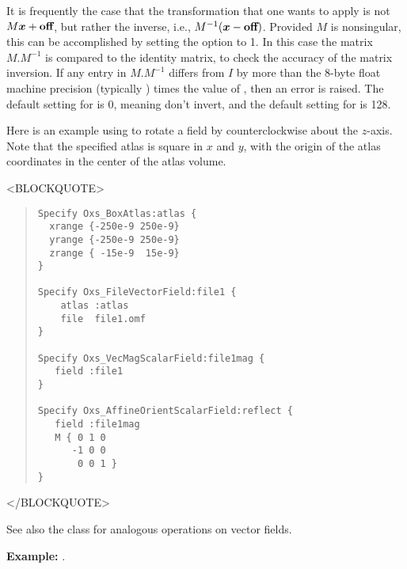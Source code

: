 \begin{description}
It is frequently the case that the transformation that one wants to
apply is not $M\mbox{\boldmath$x$}+\textbf{off}$, but rather the
inverse, i.e., $M^{-1}(\mbox{\boldmath$x$}-\textbf{off})$.  Provided $M$
is nonsingular, this can be accomplished by setting the
 option to 1.  In this case the matrix $M.M^{-1}$ is
compared to the identity matrix, to check the accuracy of the matrix
inversion.  If any entry in $M.M^{-1}$ differs from $I$ by more than the
8-byte float machine precision (typically
) times the value of
, then an error is raised. The default setting
for  is 0, meaning don't invert,
and the default setting for  is 128.

Here is an example using  to rotate a
field by  counterclockwise about the
$z$-axis.  Note that the specified atlas is square in $x$ and $y$, with
the origin of the atlas coordinates in the center of the atlas volume.
\begin{rawhtml}<BLOCKQUOTE>\end{rawhtml}
\begin{quote}
\begin{verbatim}
Specify Oxs_BoxAtlas:atlas {
  xrange {-250e-9 250e-9}
  yrange {-250e-9 250e-9}
  zrange { -15e-9  15e-9}
}

Specify Oxs_FileVectorField:file1 {
    atlas :atlas
    file  file1.omf
}

Specify Oxs_VecMagScalarField:file1mag {
   field :file1
}

Specify Oxs_AffineOrientScalarField:reflect {
   field :file1mag
   M { 0 1 0
      -1 0 0
       0 0 1 }
}\end{verbatim}
\end{quote}
\begin{rawhtml}</BLOCKQUOTE>\end{rawhtml}

See also the
class for
analogous operations on vector fields.

\textbf{Example:} .


\end{description}
